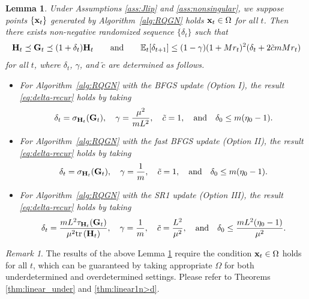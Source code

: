 \documentclass[11pt]{article}
\theoremstyle{plain}
\newtheorem{lemma}[theorem]{Lemma}
\theoremstyle{definition}
\theoremstyle{remark}
\newtheorem{remark}[theorem]{Remark}
\theoremstyle{plain}
\def\vx{{\bf{x}}}
\def\vx {{{\bf x}}}
\def\G{{\bf G}}
\def\H{{\bf H}}
\def\x{{\bf x}}
\def \tr #1{\text{\rm tr}\left(#1\right)}
\begin{document}
\begin{lemma}
    \label{lm:Gram_approximate}
    Under Assumptions \ref{ass:Jlip} and \ref{ass:nonsingular}, we suppose points $\{\vx_t\}$ generated by Algorithm~\ref{alg:RQGN} holds $\x_t\in\Omega$ for all $t$. Then there exists non-negative randomized sequence $\{\delta_t\}$ such that %
    \begin{align}
    \label{eq:delta-recur}
        \H_t\preceq\G_t\preceq(1+\delta_t)\H_t
        \qquad\text{and}\qquad
        \mathbb E_t[\delta_{t+1}]\leq (1-\gamma)(1+Mr_t)^2(\delta_t+2\tilde{c}mMr_t)
    \end{align}
    for all $t$, where $\delta_t$, $\gamma$, and $\tilde c$ are determined as follows.
    \begin{itemize}
    \item For Algorithm~\ref{alg:RQGN} with the BFGS update (Option I), the result \eqref{eq:delta-recur} holds by taking
    \begin{align*}
    \delta_t=\sigma_{\H_t}(\G_t),\quad
    \gamma=\frac{\mu^2}{mL^2},\quad
    \tilde c=1,
    \quad\text{and}\quad\delta_0\leq m(\eta_0-1).
    \end{align*}
    \item For Algorithm~\ref{alg:RQGN} with the fast BFGS update (Option II), the result \eqref{eq:delta-recur} holds by taking
    \begin{align*}
    \delta_t=\sigma_{\H_t}(\G_t),\quad
    \gamma=\frac{1}{m},\quad
    \tilde c=1,
    \quad\text{and}\quad\delta_0\leq m(\eta_0-1).
    \end{align*}
    \item For Algorithm~\ref{alg:RQGN} with the SR1 update (Option III), the result \eqref{eq:delta-recur} holds by taking
    \begin{align*}
    \delta_t=\frac{mL^2\tau_{\H_t}(\G_t)}
    {\mu^2\tr{\H_t}},\quad
    \gamma=\frac{1}{m},\quad
    \tilde c=\frac{L^2}{\mu^2},
    \quad\text{and}\quad
    \delta_0\leq \frac{mL^2(\eta_0-1)}{\mu^2}.
    \end{align*}
    \end{itemize}
\end{lemma}

\begin{remark}
The results of the above Lemma \ref{lm:Gram_approximate} require the condition $\x_t\in \Omega$ holds for all $t$, 
which can be guaranteed by taking appropriate $\Omega$ for both underdetermined and overdetermined settings.
Please refer to Theorems \ref{thm:linear_under} and \ref{thm:linear1n>d}.    
\end{remark}
\end{document}
